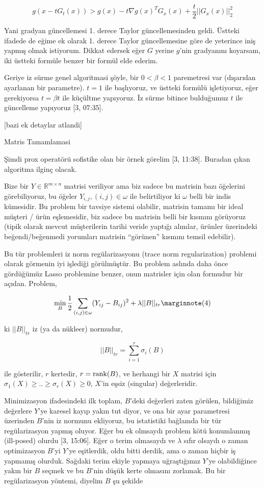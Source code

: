 \documentclass[12pt,fleqn]{article}\usepackage{../../common}
\begin{document}
$$
g(x - t G_t (x) ) > g(x) - t \nabla g(x)^T G_x(x) + \frac{t}{2} ||G_x(x)||_2^2
$$

Yani gradyan güncellemesi 1. derece Taylor güncellemesinden geldi. Üstteki
ifadede de eğime ek olarak 1. derece Taylor güncellemesine göre de
yeterince iniş yapmış olmak istiyorum. Dikkat edersek eğer $G$ yerine
$g$'nin gradyanını koyarsam, iki üstteki formüle benzer bir formül elde
ederim.

Geriye iz sürme genel algoritmasi şöyle, bir $0 < \beta < 1$ paremetresi
var (dışarıdan ayarlanan bir parametre). $t=1$ ile başlıyoruz, ve üstteki
formülü işletiyoruz, eğer gerekiyorsa $t = \beta t$ ile küçültme
yapıyoruz. İz sürme bitince bulduğumuz $t$ ile güncelleme yapıyoruz [3,
07:35].

[bazi ek detaylar atlandi]

Matris Tamamlamasi

Şimdi prox operatörü sofistike olan bir örnek görelim [3, 11:38]. Buradan
çıkan algoritma ilginç olacak. 

Bize bir $Y \in \mathbb{R}^{m \times n}$ matrisi veriliyor ama biz sadece
bu matrisin bazı öğelerini görebiliyoruz, bu öğeler
$Y_{i,j}, (i,j) \in \omega$ ile belirtiliyor ki $\omega$ belli bir indis
kümesidir. Bu problem bir tavsiye sistemi olabilir, matrisin tamamı bir
ideal müşteri / ürün eşlemesidir, biz sadece bu matrisin belli bir kısmını
görüyoruz (tipik olarak mevcut müşterilerin tarihi veride yaptığı alımlar,
ürünler üzerindeki beğendi/beğenmedi yorumları matrisin ``görünen'' kısmını
temsil edebilir). 

Bu tür problemleri iz norm regülarizasyonu (trace norm regularization)
problemi olarak görmenin iyi işlediği görülmüştür. Bu problem aslında daha
önce gördüğümüz Lasso problemine benzer, onun matrisler için olan formudur
bir açıdan. Problem,

$$
\min_B \frac{1}{2} \sum _{(i,j) \in \omega} (Y_{ij} - B_{ij})^2 + \lambda ||B||_{tr}
\mlabel{4}
$$

ki $||B||_{tr}$ iz (ya da nükleer) normudur, 

$$
||B||_{tr} = \sum _{i=1}^{r} \sigma_i(B)
$$

ile gösterilir, $r$ kertedir, $r = \operatorname{rank}(B)$, ve herhangi bir $X$ matrisi
için $\sigma_1(X) \ge .. \ge \sigma_r(X) \ge 0$, $X$'in eşsiz (singular)
değerleridir.

Minimizasyon ifadesindeki ilk toplam, $B$'deki değerleri zaten görülen,
bildiğimiz değerlere $Y$'ye karesel kayıp yakın tut diyor, ve ona bir ayar
parametresi üzerinden $B$'nin iz normunu ekliyoruz, bu istatistiki bağlamda
bir tür regülarizasyon yapmış oluyor. Eğer bu ek olmsaydı problem kötü
konumlanmış (ill-posed) olurdu [3, 15:06]. Eğer o terim olmasaydı ve
$\lambda$ sıfır olsaydı o zaman optimizasyon $B$'yi $Y$'ye eşitlerdik, oldu
bitti derdik, ama o zaman hiçbir iş yapmamış olurduk. Sağdaki terim ekiyle
yapmaya uğraştığımız $Y$'ye olabildiğince yakın bir $B$ seçmek ve bu
$B$'nin düşük kerte olmasını zorlamak. Bu bir regülarizasyon yöntemi,
diyelim $B$ şu şekilde 
\end{document}
